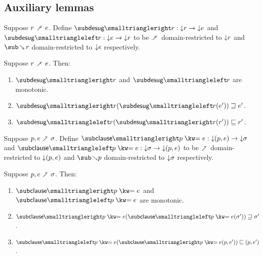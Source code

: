 \subsection{Auxiliary lemmas}

\begin{definition}
   Suppose $r \desugarFwdR e$. Define $\listRestFwdF{r}: \Below{r} \to \Below{e}$ and $\listRestBwdF{r}: \Below{e} \to \Below{r}$ to be $\desugarFwdR$ domain-restricted to ${\downarrow}{r}$ and $\desugarBwdR{r}$ domain-restricted to ${\downarrow}{e}$ respectively.
\end{definition}

\begin{lemma}
  \label{lem:aux:desugarlistrest:gc}
  Suppose $r \desugarFwdR e$. Then:
  \begin{enumerate}
     \item \label{lem:aux:desugarlistrest:gc:1} $\listRestFwdF{r}$ and $\listRestBwdF{r}$ are monotonic.
     \item \label{lem:aux:desugarlistrest:gc:2} $\listRestFwdF{r}(\listRestBwdF{r}(e')) \geq e'$.
     \item \label{lem:aux:desugarlistrest:gc:3} $\listRestBwdF{r}(\listRestFwdF{r}(r')) \leq r'$.
  \end{enumerate}
\end{lemma}

\begin{definition}
   Suppose $p, e \clauseFwdR \sigma$. Define $\clauseFwdF{\clause{p}{e}}: \Below{(p,e)} \to \Below{\sigma}$ and $\clauseBwdF{\clause{p}{e}}: \Below{\sigma} \to \Below{(p,e)}$ to be $\clauseFwdR$ domain-restricted to ${\downarrow}{(p,e)}$ and $\clauseBwdR{p}$ domain-restricted to ${\downarrow}{\sigma}$ respectively.
\end{definition}

\begin{lemma}
  \label{lem:aux:clause:gc}
  Suppose $p, e \clauseFwdR \sigma$. Then:
  \begin{enumerate}
     \item \label{lem:aux:clause:gc:1} $\clauseFwdF{\clause{p}{e}}$ and $\clauseBwdF{\clause{p}{e}}$ are monotonic.
     \item \label{lem:aux:clause:gc:2} $\clauseFwdF{\clause{p}{e}}(\clauseBwdF{\clause{p}{e}}(\sigma')) \geq \sigma'$.
     \item \label{lem:aux:clause:gc:3} $\clauseBwdF{\clause{p}{e}}(\clauseFwdF{\clause{p}{e}}(p,e')) \leq (p,e')$.
  \end{enumerate}
\end{lemma}

